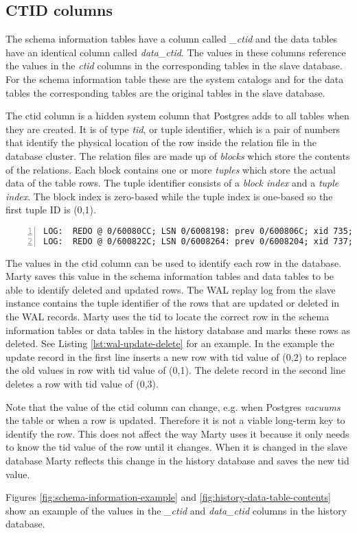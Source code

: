 \subsection{CTID columns}
\label{ch:implementation-history-ctid}
The schema information tables have a column called \textit{\_ctid} and the data tables have an identical column called \textit{data\_ctid}.
The values in these columns reference the values in the \textit{ctid} columns in the corresponding tables in the slave database.
For the schema information table these are the system catalogs and for the data tables the corresponding tables are the original tables in the slave database.

The ctid column is a hidden system column that Postgres adds to all tables when they are created.
It is of type \textit{tid}, or tuple identifier, which is a pair of numbers that identify the physical location of the row inside the relation file in the database cluster.
The relation files are made up of \textit{blocks} which store the contents of the relations.
Each block contains one or more \textit{tuples} which store the actual data of the table rows.
The tuple identifier consists of a \textit{block index} and a \textit{tuple index}.
The block index is zero-based while the tuple index is one-based so the first tuple ID is (0,1).

\begin{lstlisting}[caption={WAL update and delete example},label={lst:wal-update-delete},numbers=left,xleftmargin=2em]
LOG:  REDO @ 0/60080CC; LSN 0/6008198: prev 0/600806C; xid 735; len 37; bkpb0: Heap - update: rel 1663/16384/16385; tid 0/1 xmax 735 ; new tid 0/2 xmax 0
LOG:  REDO @ 0/600822C; LSN 0/6008264: prev 0/6008204; xid 737; len 26: Heap - delete: rel 1663/16384/16385; tid 0/3 KEYS_UPDATED
\end{lstlisting}

The values in the ctid column can be used to identify each row in the database.
Marty saves this value in the schema information tables and data tables to be able to identify deleted and updated rows.
The WAL replay log from the slave instance contains the tuple identifier of the rows that are updated or deleted in the WAL records.
Marty uses the tid to locate the correct row in the schema information tables or data tables in the history database and marks these rows as deleted.
See Listing \ref{lst:wal-update-delete} for an example.
In the example the update record in the first line inserts a new row with tid value of (0,2) to replace the old values in row with tid value of (0,1).
The delete record in the second line deletes a row with tid value of (0,3).

Note that the value of the ctid column can change, e.g. when Postgres \textit{vacuums} the table or when a row is updated.
Therefore it is not a viable long-term key to identify the row.
This does not affect the way Marty uses it because it only needs to know the tid value of the row until it changes.
When it is changed in the slave database Marty reflects this change in the history database and saves the new tid value.

Figures \ref{fig:schema-information-example} and \ref{fig:history-data-table-contents} show an example of the values in the \textit{\_ctid} and \textit{data\_ctid} columns in the history database.